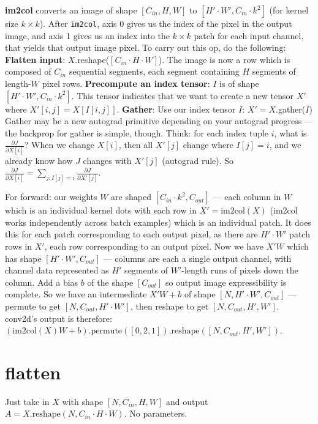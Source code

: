 \documentclass[12pt]{article}
\begin{document}
\begin{outline}
\textbf{im2col} converts an image of shape $[C_{in},H,W]$ to $[H' \cdot W',C_{in} \cdot k^2]$ (for kernel size $k \times k$).
\1 After \texttt{im2col}, axis 0 gives us the index of the pixel in the output image, and axis 1 gives us an index into the $k \times k$ patch for each input channel, that yields that output image pixel.
\1 To carry out this op, do the following:
\2 \textbf{Flatten input}: $X$.reshape($[C_{in} \cdot H \cdot W]$). The image is now a row which is composed of $C_{in}$ sequential segments, each segment containing $H$ segments of length-$W$ pixel rows.
\2 \textbf{Precompute an index tensor}: $I$ is of shape $[H' \cdot W', C_{in} \cdot k^2]$. This tensor indicates that we want to create a new tensor $X'$ where $X'[i,j] = X[I[i,j]]$.
\2 \textbf{Gather}: Use our index tensor $I$: $X' = X$.gather($I$)
\1 Gather may be a new autograd primitive depending on your autograd progress --- the backprop for gather is simple, though. Think: for each index tuple $i$, what is $\displaystyle \frac{\partial J}{\partial X[i]}$? When we change $X[i]$, then all $X'[j]$ change where $I[j] = i$, and we already know how $J$ changes with $X'[j]$ (autograd rule). So $\displaystyle \boxed{\frac{\partial J}{\partial X[i]} = \sum_{j : I[j]=i} \frac{\partial J}{\partial X'[j]}}$.
\\\0

For forward: our weights $W$ are shaped $[C_{in} \cdot k^2, C_{out}]$ --- each column in $W$ which is an individual kernel dots with each row in $X' = \text{im2col}(X)$ (im2col works independently across batch examples) which is an individual patch. It does this for each patch corresponding to each output pixel, as there are $H' \cdot W'$ patch rows in $X'$, each row corresponding to an output pixel.
\1 Now we have $X'W$ which has shape $[H' \cdot W', C_{out}]$ --- columns are each a single output channel, with channel data represented as $H'$ segments of $W'$-length runs of pixels down the column.
\1 Add a bias $b$ of the shape $[C_{out}]$ so output image expressibility is complete.
\1 So we have an intermediate $X'W + b$ of shape $[N, H' \cdot W', C_{out}]$ --- permute to get $[N,C_{out},H' \cdot W']$, then reshape to get $[N,C_{out},H',W']$.
\1 conv2d's output is therefore: $\boxed{(\text{im2col}(X)W + b).\text{permute}([0,2,1]).\text{reshape}([N,C_{out},H',W'])}$.
\0

\section{flatten}

Just take in $X$ with shape $[N,C_{in},H,W]$ and output $A=X.\text{reshape}(N,C_{in} \cdot H \cdot W)$. No parameters.

\end{outline}
\end{document}
